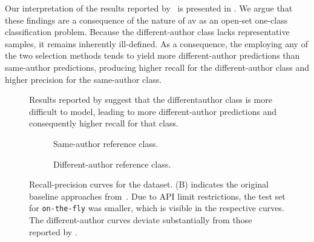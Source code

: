Our interpretation of the results reported by \citet{koppel_determining_2014}\ is presented in .
We argue that these findings are a consequence of the nature of \ac{av} as an open-set one-class classification problem.
Because the different-author class lacks representative samples, it remains inherently ill-defined.
As a consequence, the \impAppr{} employing any of the two \imp{} selection methods tends to yield more different-author predictions than same-author predictions, producing higher recall for the different-author class and higher precision for the same-author class.

\begin{figure}[htbp]
    \centering
    
    \caption[Aggregating original \impAppr{} experiment results]{Results reported by \citet{koppel_determining_2014} suggest that the different\-author class is more difficult to model, leading to more different-author predictions and consequently higher recall for that class.}
    \label{fig:findings_original_work}
\end{figure}

\begin{figure}[htbp]
  \centering
  \begin{subfigure}[b]{0.9\textwidth}
    \centering
    
    \caption{Same-author reference class. }
    \label{fig:blog_same_author}
  \end{subfigure}
  \hfill
  \begin{subfigure}[b]{0.9\textwidth}
    \centering
    
    \caption{Different-author reference class.}
    \label{fig:blog_diff_author}
  \end{subfigure}
  \caption[Recall-precision curves for the \dataBlog{} dataset]{Recall-precision curves for the \dataBlog{} dataset. 
  (B) indicates the original baseline approaches from~\citet{koppel_determining_2014}.
  Due to API limit restrictions, the test set for \texttt{on-the-fly} was smaller, which is visible in the respective curves.
  The different-author curves deviate substantially from those reported by \citet{koppel_determining_2014}.
  }
  \label{fig:diff_imp_gen_blog}
\end{figure}

